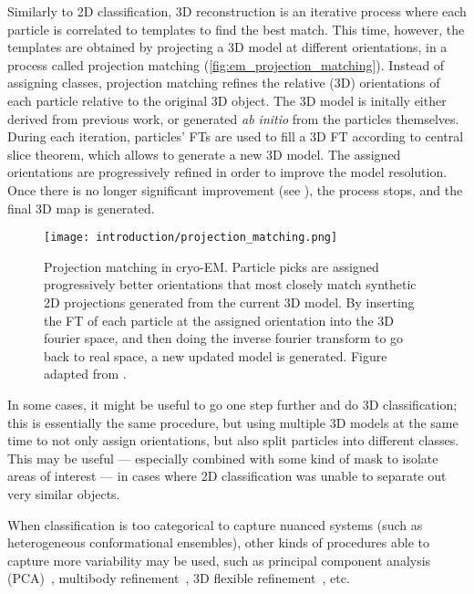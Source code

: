 Similarly to 2D classification, 3D reconstruction is an iterative process where each particle is correlated to templates to find the best match.
This time, however, the templates are obtained by projecting a 3D model at different orientations, in a process called projection matching (\autoref{fig:em_projection_matching}).
Instead of assigning classes, projection matching refines the relative (3D) orientations of each particle relative to the original 3D object.
The 3D model is initally either derived from previous work, or generated \textit{ab initio} from the particles themselves.
During each iteration, particles' FTs are used to fill a 3D FT according to central slice theorem, which allows to generate a new 3D model.
The assigned orientations are progressively refined in order to improve the model resolution.
Once there is no longer significant improvement (see ), the process stops, and the final 3D map is generated.

\begin{figure}[ht]
    \centering
    \texttt{[image: introduction/projection\_matching.png]}
    \caption[Projection matching]{Projection matching in cryo-EM. Particle picks are assigned progressively better orientations that most closely match synthetic 2D projections generated from the current 3D model. By inserting the FT of each particle at the assigned orientation into the 3D fourier space, and then doing the inverse fourier transform to go back to real space, a new updated model is generated. Figure adapted from \citet{nogalesCryoEMUniqueTool2015}.}
    \label{fig:em_projection_matching}
\end{figure}

In some cases, it might be useful to go one step further and do 3D classification; this is essentially the same procedure, but using multiple 3D models at the same time to not only assign orientations, but also split particles into different classes.
This may be useful --- especially combined with some kind of mask to isolate areas of interest --- in cases where 2D classification was unable to separate out very similar objects.

When classification is too categorical to capture nuanced systems (such as heterogeneous conformational ensembles), other kinds of procedures able to capture more variability may be used, such as principal component analysis (PCA)~\cite{castano-diezDynamoFlexibleUserfriendly2012,punjani3DVariabilityAnalysis2021}, multibody refinement~\cite{nakaneMultibodyRefinementCryoEM2021}, 3D flexible refinement~\cite{punjani3DFlexibleRefinement2022}, etc.

